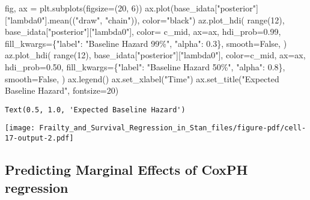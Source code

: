 \documentclass[
  letterpaper,
  DIV=11,
  numbers=noendperiod]{scrartcl}
\newenvironment{Shaded}{\begin{snugshade}}{\end{snugshade}}
\newcommand{\BuiltInTok}[1]{\textcolor[rgb]{0.00,0.23,0.31}{#1}}
\newcommand{\DecValTok}[1]{\textcolor[rgb]{0.68,0.00,0.00}{#1}}
\newcommand{\FloatTok}[1]{\textcolor[rgb]{0.68,0.00,0.00}{#1}}
\newcommand{\NormalTok}[1]{\textcolor[rgb]{0.00,0.23,0.31}{#1}}
\newcommand{\OperatorTok}[1]{\textcolor[rgb]{0.37,0.37,0.37}{#1}}
\newcommand{\StringTok}[1]{\textcolor[rgb]{0.13,0.47,0.30}{#1}}
\newcommand{\VariableTok}[1]{\textcolor[rgb]{0.07,0.07,0.07}{#1}}
\begin{document}
\begin{Shaded}
\begin{Highlighting}[]
\NormalTok{fig, ax }\OperatorTok{=}\NormalTok{ plt.subplots(figsize}\OperatorTok{=}\NormalTok{(}\DecValTok{20}\NormalTok{, }\DecValTok{6}\NormalTok{))}
\NormalTok{ax.plot(base\_idata[}\StringTok{"posterior"}\NormalTok{][}\StringTok{"lambda0"}\NormalTok{].mean((}\StringTok{"draw"}\NormalTok{, }\StringTok{"chain"}\NormalTok{)), color}\OperatorTok{=}\StringTok{"black"}\NormalTok{)}
\NormalTok{az.plot\_hdi(}
    \BuiltInTok{range}\NormalTok{(}\DecValTok{12}\NormalTok{),}
\NormalTok{    base\_idata[}\StringTok{"posterior"}\NormalTok{][}\StringTok{"lambda0"}\NormalTok{],}
\NormalTok{    color}\OperatorTok{=}\NormalTok{ c\_mid,}
\NormalTok{    ax}\OperatorTok{=}\NormalTok{ax,}
\NormalTok{    hdi\_prob}\OperatorTok{=}\FloatTok{0.99}\NormalTok{,}
\NormalTok{    fill\_kwargs}\OperatorTok{=}\NormalTok{\{}\StringTok{"label"}\NormalTok{: }\StringTok{"Baseline Hazard 99\%"}\NormalTok{, }\StringTok{"alpha"}\NormalTok{: }\FloatTok{0.3}\NormalTok{\},}
\NormalTok{    smooth}\OperatorTok{=}\VariableTok{False}\NormalTok{,}
\NormalTok{)}
\NormalTok{az.plot\_hdi(}
    \BuiltInTok{range}\NormalTok{(}\DecValTok{12}\NormalTok{),}
\NormalTok{    base\_idata[}\StringTok{"posterior"}\NormalTok{][}\StringTok{"lambda0"}\NormalTok{],}
\NormalTok{    color}\OperatorTok{=}\NormalTok{c\_mid,}
\NormalTok{    ax}\OperatorTok{=}\NormalTok{ax,}
\NormalTok{    hdi\_prob}\OperatorTok{=}\FloatTok{0.50}\NormalTok{,}
\NormalTok{    fill\_kwargs}\OperatorTok{=}\NormalTok{\{}\StringTok{"label"}\NormalTok{: }\StringTok{"Baseline Hazard 50\%"}\NormalTok{, }\StringTok{"alpha"}\NormalTok{: }\FloatTok{0.8}\NormalTok{\},}
\NormalTok{    smooth}\OperatorTok{=}\VariableTok{False}\NormalTok{,}
\NormalTok{)}
\NormalTok{ax.legend()}
\NormalTok{ax.set\_xlabel(}\StringTok{"Time"}\NormalTok{)}
\NormalTok{ax.set\_title(}\StringTok{"Expected Baseline Hazard"}\NormalTok{, fontsize}\OperatorTok{=}\DecValTok{20}\NormalTok{)}
\end{Highlighting}
\end{Shaded}

\begin{verbatim}
Text(0.5, 1.0, 'Expected Baseline Hazard')
\end{verbatim}

\texttt{[image: Frailty\_and\_Survival\_Regression\_in\_Stan\_files/figure-pdf/cell-17-output-2.pdf]}

\subsection{Predicting Marginal Effects of CoxPH
regression}\label{predicting-marginal-effects-of-coxph-regression}
\end{document}

